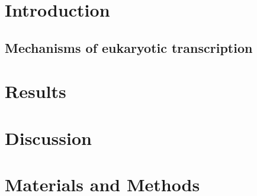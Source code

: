 \documentclass[draft]{Thesis}
\begin{document}
\frontmatter


\part{Introduction}
\chapter{Mechanisms of eukaryotic transcription}
\blindtext[3]
\citep{chenthe2015}
\citep{davida2006}
\citep{birdribozyme2005}
\citep{castelnuovorole2014,birdribozyme2005}
\blindtext
\part{Results}

\part{Discussion}

\part{Materials and Methods}

\singlespacing


\end{document}
